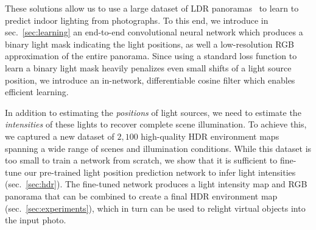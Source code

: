 These solutions allow us to use a large dataset of LDR panoramas~\cite{xiao-cvpr-12} to learn to predict indoor lighting from photographs. To this end, we introduce in sec.~\ref{sec:learning} an end-to-end convolutional neural network which produces a binary light mask indicating the light positions, as well a low-resolution RGB approximation of the entire panorama. Since using a standard loss function to learn a binary light mask heavily penalizes even small shifts of a light source position, we introduce an in-network, differentiable cosine filter which enables efficient learning. 

In addition to estimating the \emph{positions} of light sources, we need to estimate the \emph{intensities} of these lights to recover complete scene illumination. To achieve this, we captured a new dataset of $2,100$ high-quality HDR environment maps spanning a wide range of scenes and illumination conditions. While this dataset is too small to train a network from scratch, we show that it is sufficient to fine-tune our pre-trained light position prediction network to infer light intensities (sec.~\ref{sec:hdr}). The fine-tuned network produces a light intensity map and RGB panorama that can be combined to create a final HDR environment map (sec.~\ref{sec:experiments}), which in turn can be used to relight virtual objects into the input photo.



